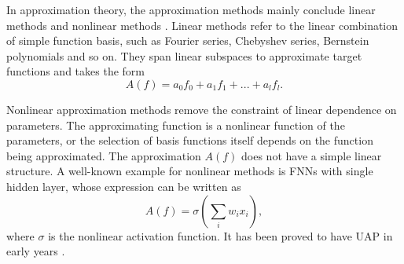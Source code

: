 \documentclass{article}
\theoremstyle{plain}
\theoremstyle{definition}
\theoremstyle{remark}
\begin{document}


In approximation theory, the approximation methods mainly conclude linear methods \cite{pinkus2012} and nonlinear methods \cite{devore1998}. Linear methods refer to the linear combination of simple function basis, such as Fourier series, Chebyshev series, Bernstein polynomials and so on. They span linear subspaces to approximate target functions and takes the form
\begin{equation*}
    A(f) = a_0 f_0+a_1f_1+...+a_l f_l.
\end{equation*}

Nonlinear approximation methods remove the constraint of linear dependence on parameters. The approximating function is a nonlinear function of the parameters, or the selection of basis functions itself depends on the function being approximated. The approximation $A(f)$ does not have a simple linear structure. A well-known example for nonlinear methods is FNNs with single hidden layer, whose expression can be written as
\begin{equation*}
    A(f) = \sigma(\sum_{i}w_i x_i),
\end{equation*}
where $\sigma$ is the nonlinear activation function. It has been proved to have UAP in early years \cite{cybenko1989,hornik1989}.
\end{document}
